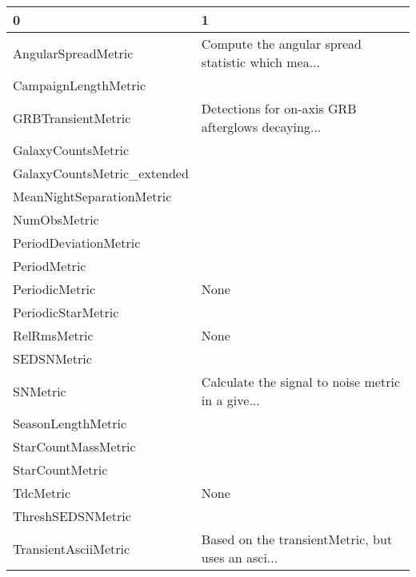 \begin{tabular}{ll}
\toprule
                           0 &                                                  1 \\
\midrule
         AngularSpreadMetric &  Compute the angular spread statistic which mea... \\
        CampaignLengthMetric &                                                    \\
          GRBTransientMetric &  Detections for on-axis GRB afterglows decaying... \\
          GalaxyCountsMetric &                                                    \\
 GalaxyCountsMetric\_extended &                                                    \\
   MeanNightSeparationMetric &                                                    \\
                NumObsMetric &                                                    \\
       PeriodDeviationMetric &                                                    \\
                PeriodMetric &                                                    \\
              PeriodicMetric &                                               None \\
          PeriodicStarMetric &                                                    \\
                RelRmsMetric &                                               None \\
                 SEDSNMetric &                                                    \\
                    SNMetric &  Calculate the signal to noise metric in a give... \\
          SeasonLengthMetric &                                                    \\
         StarCountMassMetric &                                                    \\
             StarCountMetric &                                                    \\
                   TdcMetric &                                               None \\
           ThreshSEDSNMetric &                                                    \\
        TransientAsciiMetric &  Based on the transientMetric, but uses an asci... \\

\end{tabular}
